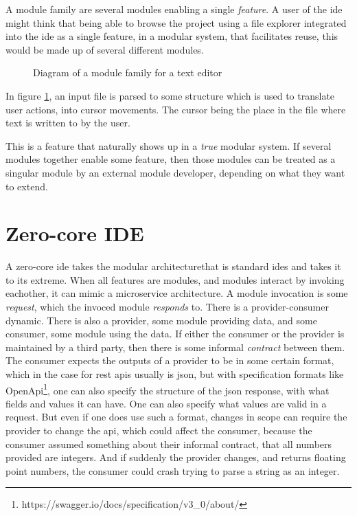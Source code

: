 A module family are several modules enabling a single
\textit{feature}. A user of the \gls*{ide} might think that being able to browse
the project using a file explorer integrated into the \gls*{ide} as a single
feature, in a modular system, that facilitates reuse, this would be made up of
several different modules.

\begin{figure}[H]
  \centering
  
  \caption{Diagram of a module family for a text editor}
  \label{fig:textEditorSimple}
\end{figure}

In figure \ref{fig:textEditorSimple}, an input file is parsed to some structure
which is used to translate user actions, into cursor movements. The cursor being
the place in the file where text is written to by the user.

This is a feature that naturally shows up in a \textit{true} modular system. If
several modules together enable some feature, then those modules can be treated
as a singular module by an external module developer, depending on what they
want to extend.


\section{Zero-core IDE}

A zero-core \gls*{ide} takes the modular architecturethat is standard \gls*{ide}s
and takes it to its extreme. When all features are modules, and modules interact
by invoking eachother, it can mimic a microservice architecture. A module
invocation is some \textit{request}, which the invoced module \textit{responds}
to. There is a provider-consumer dynamic. There is also a provider, some module
providing data, and some consumer, some module using the data. If either the
consumer or the provider is maintained by a third party, then there is some
informal \textit{contract} between them. The consumer expects the outputs of a
provider to be in some certain format, which in the case for \gls*{rest}
\gls*{api}s usually is \gls*{json}, but with specification formats like OpenApi\footnote{https://swagger.io/docs/specification/v3\_0/about/},
one can also specify the structure of the \gls*{json} response, with what fields
and values it can have. One can also specify what values are valid in a request.
But even if one does use such a format, changes in scope can require the
provider to change the \gls*{api}, which could affect the consumer, because the
consumer assumed something about their informal contract, that all numbers
provided are integers. And if suddenly the provider changes, and returns
floating point numbers, the consumer could crash trying to parse a string as an
integer.

